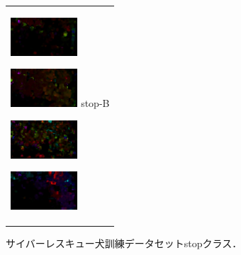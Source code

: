 \begin{figure}[htbp]
\begin{tabular}{l}
\begin{minipage}{0.165\hsize}
\begin{center}
          \hspace{0.3cm} { }
        \end{center}
      \end{minipage}
      \begin{minipage}{0.165\hsize}
        \begin{center}
          \includegraphics[clip, width=2.5cm]{./Figures/optic_stop2-2.eps}
          \hspace{0.0cm} { }
        \end{center}
      \end{minipage}
      \begin{minipage}{0.165\hsize}
        \begin{center}
          \includegraphics[clip, width=2.5cm]{./Figures/optic_stop2-3.eps}
          \hspace{2.0cm} {stop-B}
        \end{center}
      \end{minipage}
      \begin{minipage}{0.165\hsize}
        \begin{center}
          \includegraphics[clip, width=2.5cm]{./Figures/optic_stop2-4.eps}
          \hspace{0.1cm} { }
        \end{center}
      \end{minipage}
      \begin{minipage}{0.165\hsize}
        \begin{center}
          \includegraphics[clip, width=2.5cm]{./Figures/optic_stop2-5.eps}
          \hspace{2.2cm} { }
        \end{center}
      \end{minipage}
    \end{tabular}
    \caption{サイバーレスキュー犬訓練データセットstopクラス．}
    \label{stop}
\end{figure}

